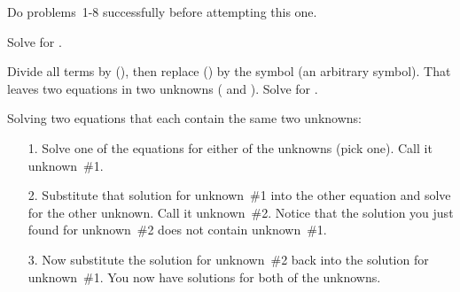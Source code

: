 {
{Do problems~1-8 successfully before attempting this one.
}

{ \newline
  \newline
 Solve for \m{\theta}. 
}

{\newline
}

{Divide all terms by (), then replace () by the symbol 
 (an arbitrary symbol).
 That leaves two equations in two unknowns ( and \m{\theta}).
 Solve for \m{\theta}.
}

{ \newline
}

{Solving two equations that each contain the same two unknowns:
 \begin{itemize}
 \item [1.] Solve one of the equations for either of the unknowns
 (pick one).  Call it unknown~\#1.
 \item [2.] Substitute that solution for unknown~\#1 into the other
 equation and solve for the other unknown. Call it unknown~\#2.
 Notice that the solution you just found for unknown~\#2 does not contain
 unknown~\#1.
 \item [3.] Now substitute the solution for unknown~\#2 back into
 the solution for unknown~\#1.
 You now have solutions for both of the unknowns.
 \end{itemize}
}

}%
    